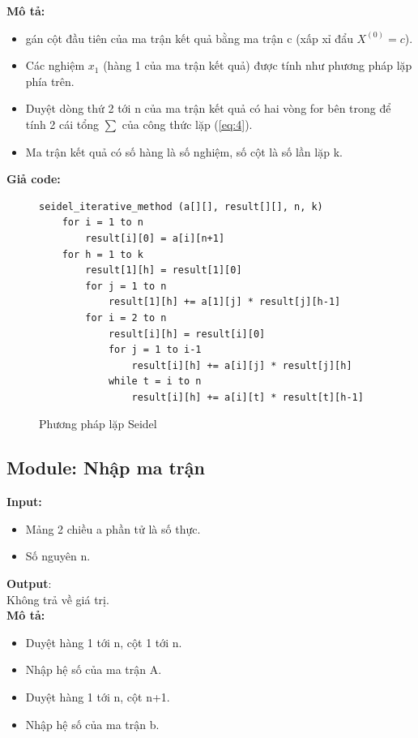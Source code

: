 \documentclass[twoside]{report2}
\begin{document}
\textbf{Mô tả:}
\begin{itemize}
\item gán cột đầu tiên của ma trận kết quả bằng ma trận c (xấp xỉ đẩu $X^{(0)} = c$).
\item Các nghiệm $x_1$ (hàng 1 của ma trận kết quả) được tính như phương pháp lặp phía trên.
\item Duyệt dòng thứ 2 tới n của ma trận kết quả có hai vòng for bên trong để tính 2 cái tổng $\sum$ của công thức lặp (\ref{eq:4}).
\item Ma trận kết quả có số hàng là số nghiệm, số cột là số lần lặp k.
\end{itemize}


\textbf{Giả code:}
\begin{figure}[h]
\begin{lstlisting}[frame=single]
seidel_iterative_method (a[][], result[][], n, k)
    for i = 1 to n
        result[i][0] = a[i][n+1]
    for h = 1 to k
        result[1][h] = result[1][0]
        for j = 1 to n
            result[1][h] += a[1][j] * result[j][h-1]
        for i = 2 to n
            result[i][h] = result[i][0]
            for j = 1 to i-1
                result[i][h] += a[i][j] * result[j][h]
            while t = i to n
                result[i][h] += a[i][t] * result[t][h-1]
\end{lstlisting}
\caption{Phương pháp lặp Seidel}
\end{figure}

\newpage
\subsection{Module: Nhập ma trận}
\textbf{Input:}
\begin{itemize}
\item Mảng 2 chiều a phần tử là số thực.
\item Số nguyên n.
\end{itemize}
\textbf{Output}:\\

\quad Không trả về giá trị.\\

\textbf{Mô tả:}
\begin{itemize}
\item Duyệt hàng 1 tới n, cột 1 tới n.
\item Nhập hệ số của ma trận A.
\item Duyệt hàng 1 tới n, cột n+1.
\item Nhập hệ số của ma trận b.
\end{itemize}
\end{document}
